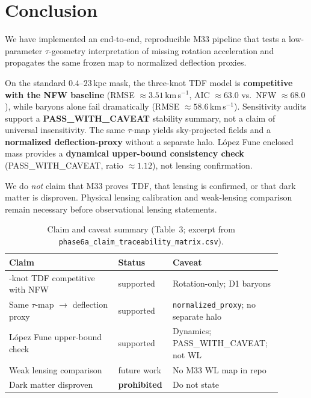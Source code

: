 \documentclass[11pt,a4paper]{article}
\begin{document}
\section{Conclusion}
\label{sec:conclusion}

We have implemented an end-to-end, reproducible M33 pipeline that tests a low-parameter $\tau$-geometry interpretation of missing rotation acceleration and propagates the same frozen map to normalized deflection proxies.

On the standard $0.4$--$23$\,kpc mask, the three-knot TDF model is \textbf{competitive with the NFW baseline} (RMSE $\approx 3.51$\,km\,s$^{-1}$, AIC $\approx 63.0$ vs.\ NFW $\approx 68.0$), while baryons alone fail dramatically (RMSE $\approx 58.6$\,km\,s$^{-1}$).
Sensitivity audits support a \textbf{PASS\_WITH\_CAVEAT} stability summary, not a claim of universal insensitivity.
The same $\tau$-map yields sky-projected fields and a \textbf{normalized deflection-proxy} without a separate halo.
L\'opez Fune enclosed mass provides a \textbf{dynamical upper-bound consistency check} (PASS\_WITH\_CAVEAT, ratio $\approx 1.12$), not lensing confirmation.

We do \emph{not} claim that M33 proves TDF, that lensing is confirmed, or that dark matter is disproven.
Physical lensing calibration and weak-lensing comparison remain necessary before observational lensing statements.

\begin{table}[ht]
  \centering
  \caption{Claim and caveat summary (Table~3; excerpt from \texttt{phase6a\_claim\_traceability\_matrix.csv}).}
  \label{tab:claims}
  \begin{tabular}{>{\raggedright\arraybackslash}p{0.38\linewidth}p{0.14\linewidth}p{0.38\linewidth}}
    \toprule
    Claim & Status & Caveat \\
    \midrule
    3-knot TDF competitive with NFW & supported & Rotation-only; D1 baryons \\
    Same $\tau$-map $\to$ deflection proxy & supported & \texttt{normalized\_proxy}; no separate halo \\
    L\'opez Fune upper-bound check & supported & Dynamics; PASS\_WITH\_CAVEAT; not WL \\
    Weak lensing comparison & future work & No M33 WL map in repo \\
    Dark matter disproven & \textbf{prohibited} & Do not state \\
    \bottomrule
  \end{tabular}
\end{table}
\end{document}
